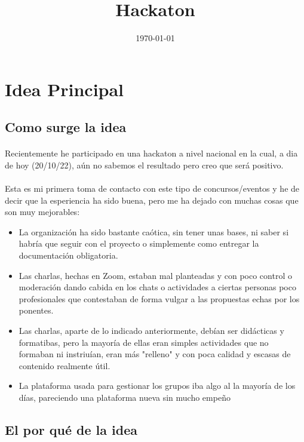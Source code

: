 \documentclass[a4paper]{article}
\title{Hackaton}
\date{\today}
\begin{document}
    \maketitle
    \tableofcontents
    \section[Idea]{Idea Principal}
    \subsection[Inicio]{Como surge la idea}
    \paragraph{}
    Recientemente he participado en una hackaton a nivel nacional
    en la cual, a dia de hoy (20/10/22), aún no sabemos el resultado 
    pero creo que será positivo.
    \paragraph{}
    Esta es mi primera toma de contacto con este tipo de concursos/eventos
    y he de decir que la esperiencia ha sido buena, pero me ha dejado con 
    muchas cosas que son muy mejorables:
    \begin{itemize}
        \item La organización ha sido bastante caótica, sin tener unas bases, 
        ni saber si habría que seguir con el proyecto o simplemente como entregar 
        la documentación obligatoria.
        \item Las charlas, hechas en Zoom, estaban mal planteadas y con poco control o moderación 
        dando cabida en los chats o actividades a ciertas personas poco profesionales
        que contestaban de forma vulgar a las propuestas echas por los ponentes.
        \item Las charlas, aparte de lo indicado anteriormente, debían ser didácticas 
        y formatibas, pero la mayoría de ellas eran simples actividades que no formaban ni
        instriuían, eran más "relleno" y con poca calidad y escasas de contenido realmente 
        útil.
        \item La plataforma usada para gestionar los grupos iba algo al la mayoría de los 
        días, pareciendo una plataforma nueva sin mucho empeño
    \end{itemize}
    \subsection[¿Por que?]{El por qué de la idea}
\end{document}
